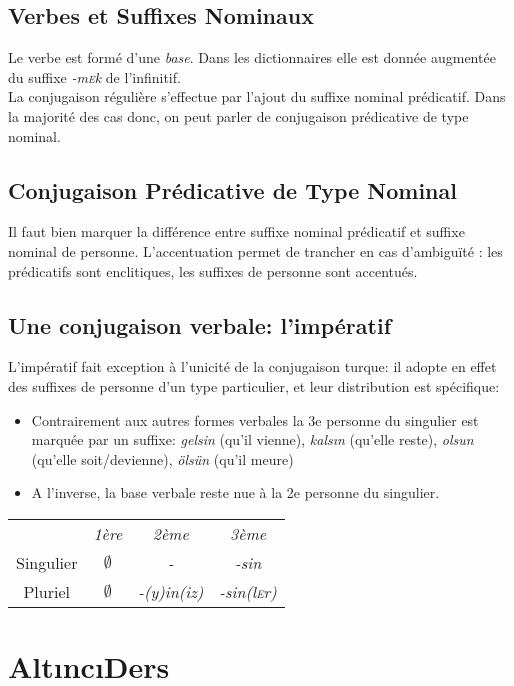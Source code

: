 \documentclass{cours}
\newcommand{\sce}{\textsc{e}}
\begin{document}
\subsection{Verbes et Suffixes Nominaux}
Le verbe est formé d'une \emph{base}. Dans les dictionnaires elle est donnée augmentée du suffixe \textsl{-m\sce k} de l'infinitif.\\
La conjugaison régulière s'effectue par l'ajout du suffixe nominal prédicatif. Dans la majorité des cas donc, on peut parler de conjugaison prédicative de type nominal.

\subsection{Conjugaison Prédicative de Type Nominal}
Il faut bien marquer la différence entre suffixe nominal prédicatif et suffixe nominal de personne. L'accentuation permet de trancher en cas d'ambiguïté : les prédicatifs sont enclitiques, les suffixes de personne sont accentués.

\subsection{Une conjugaison verbale: l'impératif}
L'impératif fait exception à l'unicité de la conjugaison turque: il adopte en effet des suffixes de personne d'un type particulier, et leur distribution est spécifique:
\begin{itemize}
    \item Contrairement aux autres formes verbales la 3e personne du singulier est marquée par un suffixe: \textsl{gelsin} (qu'il vienne), \textsl{kals\i n} (qu'elle reste), \textsl{olsun} (qu'elle soit/devienne), \textsl{ölsün} (qu'il meure)
    \item A l'inverse, la base verbale reste nue à la 2e personne du singulier.
\end{itemize}
\begin{center}
    \begin{tabular}{c>{\sl}c>{\sl}c>{\sl}c}
                  & 1ère        & 2ème       & 3ème          \\
        Singulier & $\emptyset$ & -          & -sin          \\
        Pluriel   & $\emptyset$ & -(y)in(iz) & -sin(l\sce r)
    \end{tabular}
\end{center}

\section{Alt\i nc\i Ders}
\end{document}
